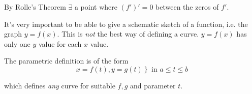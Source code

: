 \documentclass[10pt]{scrartcl}
\begin{document}
By Rolle's Theorem $\exists$ a point where $(f')' = 0$ between the zeros of $f'$. 

%
%
%


It's very important to be able to give a schematic sketch of a function, i.e. the graph $y = f(x)$. This is \emph{not} the best way of defining a curve. $y = f(x)$ has only one $y$ value for each $x$ value. 

%

\vspace*{5pt}


\begin{definition}
The parametric definition is of the form
\[\left. x = f(t), y= g(t) \right\} \text{ in } a \leq t \leq b\]

which defines \emph{any} curve for suitable $f,g$ and parameter $t$.
\end{definition}\vspace*{5pt}
\end{document}
